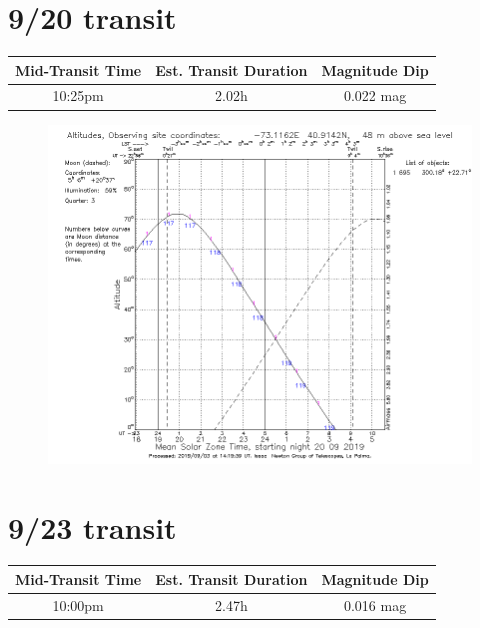 \documentclass{article}[12pt]
\begin{document}
	
\section{9/20 transit}
	
\begin{table}[h]
	\begin{center}
	\begin{tabular}{|c | c | c|}
		\hline
		Mid-Transit Time & Est. Transit Duration & Magnitude Dip \\
		\hline
		\hline
		10:25pm & 2.02h & 0.022 mag\\
		\hline
	\end{tabular}
	\end{center}
\end{table}

\begin{figure}[h]
	\includegraphics[width=\linewidth]{695_9_20.png}
\end{figure}

\newpage

\section{9/23 transit}

\begin{table}[h]
	\begin{center}
		\begin{tabular}{|c | c | c|}
			\hline
			Mid-Transit Time & Est. Transit Duration & Magnitude Dip \\
			\hline
			\hline
			10:00pm & 2.47h & 0.016 mag\\
			\hline
		\end{tabular}
	\end{center}
\end{table}
\end{document}
